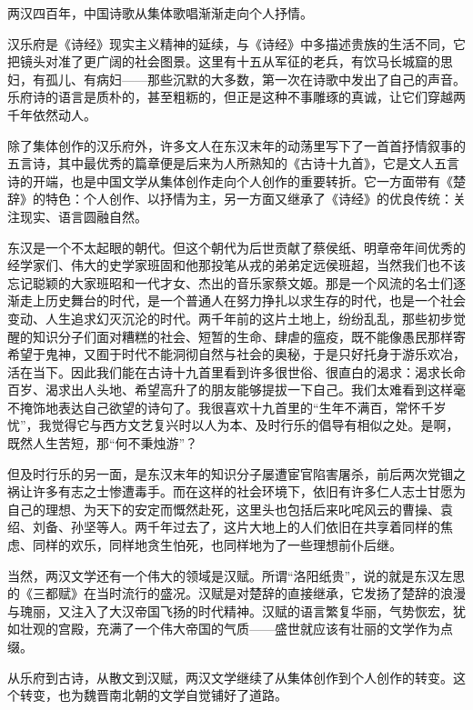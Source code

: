 
\begin{intro}
两汉四百年，中国诗歌从集体歌唱渐渐走向个人抒情。

汉乐府是《诗经》现实主义精神的延续，与《诗经》中多描述贵族的生活不同，它把镜头对准了更广阔的社会图景。这里有十五从军征的老兵，有饮马长城窟的思妇，有孤儿、有病妇——那些沉默的大多数，第一次在诗歌中发出了自己的声音。乐府诗的语言是质朴的，甚至粗粝的，但正是这种不事雕琢的真诚，让它们穿越两千年依然动人。
    
除了集体创作的汉乐府外，许多文人在东汉末年的动荡里写下了一首首抒情叙事的五言诗，其中最优秀的篇章便是后来为人所熟知的《古诗十九首》，它是文人五言诗的开端，也是中国文学从集体创作走向个人创作的重要转折。它一方面带有《楚辞》的特色：个人创作、以抒情为主，另一方面又继承了《诗经》的优良传统：关注现实、语言圆融自然。

东汉是一个不太起眼的朝代。但这个朝代为后世贡献了蔡侯纸、明章帝年间优秀的经学家们、伟大的史学家班固和他那投笔从戎的弟弟定远侯班超，当然我们也不该忘记聪颖的大家班昭和一代才女、杰出的音乐家蔡文姬。那是一个风流的名士们逐渐走上历史舞台的时代，是一个普通人在努力挣扎以求生存的时代，也是一个社会变动、人生追求幻灭沉沦的时代。两千年前的这片土地上，纷纷乱乱，那些初步觉醒的知识分子们面对糟糕的社会、短暂的生命、肆虐的瘟疫，既不能像愚民那样寄希望于鬼神，又囿于时代不能洞彻自然与社会的奥秘，于是只好托身于游乐欢冶，活在当下。因此我们能在古诗十九首里看到许多很世俗、很直白的渴求：渴求长命百岁、渴求出人头地、希望高升了的朋友能够提拔一下自己。我们太难看到这样毫不掩饰地表达自己欲望的诗句了。我很喜欢十九首里的“生年不满百，常怀千岁忧”，我觉得它与西方文艺复兴时以人为本、及时行乐的倡导有相似之处。是啊，既然人生苦短，那“何不秉烛游”？

但及时行乐的另一面，是东汉末年的知识分子屡遭宦官陷害屠杀，前后两次党锢之祸让许多有志之士惨遭毒手。而在这样的社会环境下，依旧有许多仁人志士甘愿为自己的理想、为天下的安定而慨然赴死，这里头也包括后来叱咤风云的曹操、袁绍、刘备、孙坚等人。两千年过去了，这片大地上的人们依旧在共享着同样的焦虑、同样的欢乐，同样地贪生怕死，也同样地为了一些理想前仆后继。
    
当然，两汉文学还有一个伟大的领域是汉赋。所谓“洛阳纸贵”，说的就是东汉左思的《三都赋》在当时流行的盛况。汉赋是对楚辞的直接继承，它发扬了楚辞的浪漫与瑰丽，又注入了大汉帝国飞扬的时代精神。汉赋的语言繁复华丽，气势恢宏，犹如壮观的宫殿，充满了一个伟大帝国的气质——盛世就应该有壮丽的文学作为点缀。
    
从乐府到古诗，从散文到汉赋，两汉文学继续了从集体创作到个人创作的转变。这个转变，也为魏晋南北朝的文学自觉铺好了道路。
\end{intro}
